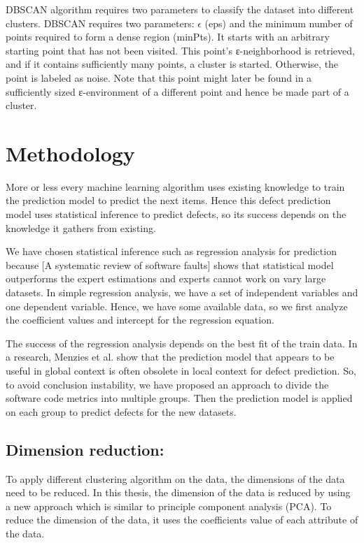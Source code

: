 \documentclass[12pt]{report}
\begin{document}
DBSCAN algorithm requires two parameters to classify the dataset into different clusters. DBSCAN requires two parameters: $\epsilon$ (eps) and the minimum number of points required to form a dense region (minPts). It starts with an arbitrary starting point that has not been visited. This point's ε-neighborhood is retrieved, and if it contains sufficiently many points, a cluster is started. Otherwise, the point is labeled as noise. Note that this point might later be found in a sufficiently sized ε-environment of a different point and hence be made part of a cluster.

\section{Methodology}
More or less every machine learning algorithm uses existing knowledge to train the prediction model to predict the next items. Hence this defect prediction model uses statistical inference to predict defects, so its success depends on the knowledge it gathers from existing. 

We have chosen statistical inference such as regression analysis for prediction because [A systematic review of software faults] shows that statistical model outperforms the expert estimations and experts cannot work on vary large datasets. In simple regression analysis, we have a set of independent variables and one dependent variable. Hence, we have some available data, so we first analyze the coefficient values and intercept for the regression equation.

The success of the regression analysis depends on the best fit of the train data. In a research, Menzies et al. show that the prediction model that appears to be useful in global context is often obsolete in local context for defect prediction. So, to avoid conclusion instability, we have proposed an approach to divide the software code metrics into multiple groups. Then the prediction model is applied on each group to predict defects for the new datasets.  

\subsection{Dimension reduction:} 
To apply different clustering algorithm on the data, the dimensions of the data need to be reduced. In this thesis, the dimension of the data is reduced by using a new approach which is similar to principle component analysis (PCA). To reduce the dimension of the data, it uses the coefficients value of each attribute of the data. 
\end{document}
